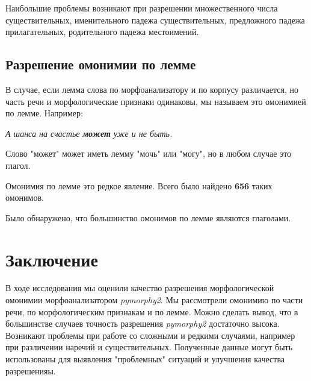\documentclass[a4paper,14pt]{article}
\begin{document}
	Наибольшие проблемы возникают при разрешении множественного числа существительных, именительного падежа существительных, предложного падежа прилагательных, родительного падежа местоимений.  

	\subsection{Разрешение омонимии по лемме}

	В случае, если лемма слова по морфоанализатору и по корпусу различается, но часть речи и морфологические признаки одинаковы, мы называем это омонимией по лемме.
	Например:
	\begin{center}
		\textit{А шанса на счастье \textbf{может} уже и не быть.}
	\end{center}
	Слово "может" может иметь лемму "мочь" или "могу", но в любом случае это глагол.

	Омонимия по лемме это редкое явление.
	Всего было найдено \textbf{656} таких омонимов.

	\begin{center}
    \end{center}

    Было обнаружено, что большинство омонимов по лемме являются глаголами.

    \begin{center}
    \end{center}


	\section{Заключение}

	В ходе исследования мы оценили качество разрешения морфологической омонимии морфоанализатором \textit{pymorphy2}. Мы рассмотрели омонимию по части речи, по морфологическим признакам и по лемме. Можно сделать вывод, что в большинстве случаев точность разрешения \textit{pymorphy2} достаточно высока. Возникают проблемы при работе со сложными и редкими случаями, например при различении наречий и существительных. Полученные данные могут быть использованы для выявления "проблемных" ситуаций и улучшения качества разрешенияы. 
 
\end{document}
